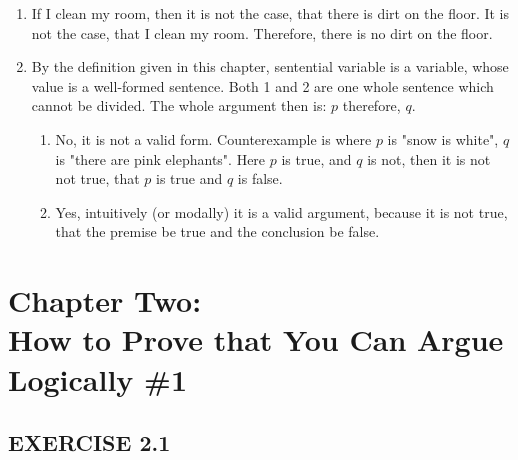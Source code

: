 \documentclass[a4paper,12pt]{article}
\begin{document}
\begin{enumerate}[label=\arabic*,leftmargin=*]
        \item If I clean my room, then it is not the case, that there is dirt on the floor. It is not the case, that I clean my room. Therefore, there is no dirt on the floor.

        \item By the definition given in this chapter, sentential variable is a variable, whose value is a well-formed sentence. Both 1 and 2 are one whole sentence which cannot be divided. The whole argument then is: $p$ therefore, $q$.
            \begin{enumerate}[label=(\roman*)]
                \item No, it is not a valid form. Counterexample is where $p$ is "snow is white", $q$ is "there are pink elephants". Here $p$ is true, and $q$ is not, then it is not not true, that $p$ is true and $q$ is false.
                \item Yes, intuitively (or modally) it is a valid argument, because it is not true, that the premise be true and the conclusion be false.
            \end{enumerate}

    \end{enumerate}

    \newpage

    \section*{Chapter Two:\\How to Prove that You Can Argue Logically \#1}

    \subsection*{EXERCISE 2.1}
\end{document}

